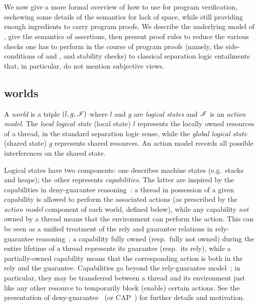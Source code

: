 \section{\colosl}\label{sec:colosl}
We now give a more formal overview of how to use \colosl for program
verification, eschewing some details of the semantics for lack of space,
while still providing enough ingredients to carry program proofs. We
describe the underlying model of \colosl, give the semantics of
\colosl assertions, then present proof rules to reduce the various
checks one has to perform in the course of \colosl program proofs
(namely, the side-conditions of \shiftRule and \extendRule, and
stability checks) to classical separation logic entailments that, in
particular, do not mention subjective views.


\subsection{\colosl worlds}
\label{subsec:model}

A \emph{world} is a triple $(l, g, \mathscr{I})$ where $l$ and $g$ are
\emph{logical states} and $\mathscr{I}$ is an \emph{action model}. The
\emph{local logical state} (local state) $l$ represents the
locally owned resources of a thread, in the standard separation logic
sense, while the \emph{global logical state} (shared state)
$g$ represents shared resources. An action model records all possible interferences on the shared state.

Logical states have two components: one describes machine states
(e.g.\ stacks and heaps); the other represents
\emph{capabilities}. The latter are inspired by the capabilities in
deny-guarantee reasoning~\cite{dg}: a thread in possession of a given
capability is allowed to perform the associated actions (as prescribed
by the \emph{action model} component of each world, defined below),
while any capability \emph{not} owned by a thread means that the
environment can perform the action. This can be seen as a unified
treatment of the rely and guarantee relations in rely-guarantee
reasoning~\cite{rg}: a capability fully owned (resp.\ fully not owned)
during the entire lifetime of a thread represents its guarantee
(resp.\ its rely), while a partially-owned capability means that the
corresponding action is both in the rely and the
guarantee. Capabilities go beyond the rely-guarantee model~\cite{dg};
in particular, they may be transferred between a thread and its
environment just like any other resource to temporarily block (enable) certain actions. See the presentation of
deny-guarantee~\cite{dg} (or CAP~\cite{cap-ecoop10}) for further details
and motivation.

